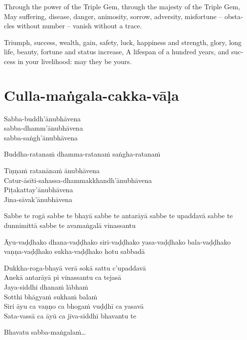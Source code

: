 \bigskip

\begin{english}
  \setlength{\parskip}{8pt}%
  Through the power of the Triple Gem, through the majesty of the Triple Gem,
  May suffering, disease, danger, animosity, sorrow, adversity, misfortune --
  obstacles without number -- vanish without a trace.

  Triumph, success, wealth, gain, safety, luck, happiness and strength,
  glory, long life, beauty, fortune and status increase,
  A lifespan of a hundred years, and success in your livelihood: may they be yours.
\end{english}

\section{Culla-maṅgala-cakka-vāḷa}


Sabba-buddh'ānubhāvena\\
sabba-dhamm'ānubhāvena\\
sabba-saṅgh'ānubhāvena

Buddha-ratanaṁ dhamma-ratanaṁ saṅgha-ratanaṁ

Tiṇṇaṁ ratanānaṁ ānubhāvena\\
Catur-āsīti-sahassa-dhammakkhandh'ānubhāvena\\
Piṭakattay'ānubhāvena\\
Jina-sāvak'ānubhāvena

Sabbe te rogā sabbe te bhayā sabbe te antarāyā sabbe te upaddavā sabbe te
dunnimittā sabbe te avamaṅgalā vinassantu

Āyu-vaḍḍhako dhana-vaḍḍhako siri-vaḍḍhako yasa-vaḍḍhako bala-vaḍḍhako
vaṇṇa-vaḍḍhako sukha-vaḍḍhako hotu sabbadā

Dukkha-roga-bhayā verā sokā sattu c'upaddavā\\
Anekā antarāyā pi vinassantu ca tejasā\\
Jaya-siddhi dhanaṁ lābhaṁ\\
Sotthi bhāgyaṁ sukhaṁ balaṁ\\
Siri āyu ca vaṇṇo ca bhogaṁ vuḍḍhī ca yasavā\\
Sata-vassā ca āyū ca jīva-siddhī bhavantu te

Bhavatu sabba-maṅgalaṁ\ldots{}

\bigskip

